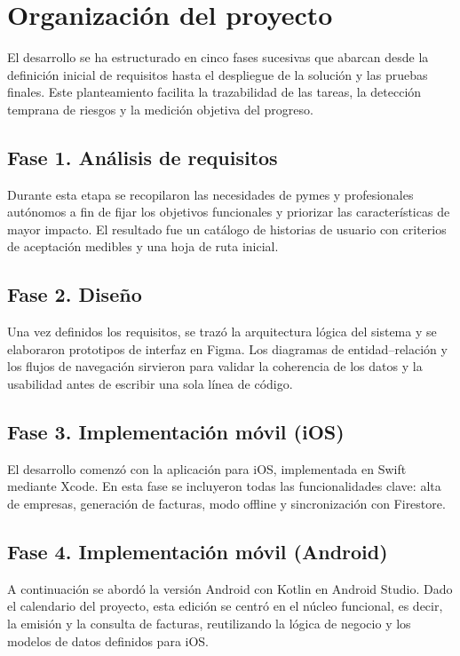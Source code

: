 \section{Organización del proyecto}
\begin{large}
El desarrollo se ha estructurado en cinco fases sucesivas que abarcan desde la definición inicial de requisitos hasta el despliegue de la solución y las pruebas finales. Este planteamiento facilita la trazabilidad de las tareas, la detección temprana de riesgos y la medición objetiva del progreso.

\subsection*{Fase 1. Análisis de requisitos}
Durante esta etapa se recopilaron las necesidades de pymes y profesionales autónomos a fin de fijar los objetivos funcionales y priorizar las características de mayor impacto. El resultado fue un catálogo de historias de usuario con criterios de aceptación medibles y una hoja de ruta inicial.

\subsection*{Fase 2. Diseño}
Una vez definidos los requisitos, se trazó la arquitectura lógica del sistema y se elaboraron prototipos de interfaz en Figma. Los diagramas de entidad–relación y los flujos de navegación sirvieron para validar la coherencia de los datos y la usabilidad antes de escribir una sola línea de código.

\subsection*{Fase 3. Implementación móvil (iOS)}
El desarrollo comenzó con la aplicación para iOS, implementada en Swift mediante Xcode. En esta fase se incluyeron todas las funcionalidades clave: alta de empresas, generación de facturas, modo offline y sincronización con Firestore.

\subsection*{Fase 4. Implementación móvil (Android)}
A continuación se abordó la versión Android con Kotlin en Android Studio. Dado el calendario del proyecto, esta edición se centró en el núcleo funcional, es decir, la emisión y la consulta de facturas, reutilizando la lógica de negocio y los modelos de datos definidos para iOS.


\end{large}
